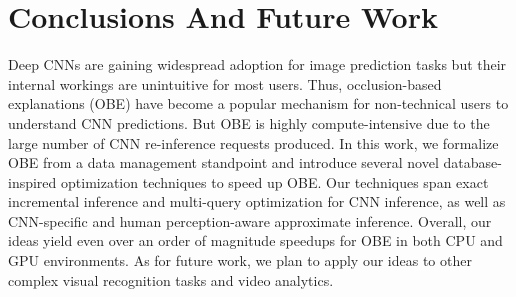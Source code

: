 \documentclass[10pt, sigconf]{acmart}
\newcommand{\red}{\textcolor{red}}
\begin{document}


\section{Conclusions And Future Work}
Deep CNNs are gaining widespread adoption for image prediction tasks but their internal workings are unintuitive for most users. Thus, occlusion-based explanations (OBE) have become a popular mechanism for non-technical users to understand CNN predictions. But OBE is highly compute-intensive due to the large number of CNN re-inference requests produced. In this work, we formalize OBE from a data management standpoint and introduce several novel database-inspired optimization techniques to speed up OBE. Our techniques span exact incremental inference and multi-query optimization for CNN inference, as well as CNN-specific and human perception-aware approximate inference. Overall, our ideas yield even over an order of magnitude speedups for OBE in both CPU and GPU environments.
As for future work, we plan to apply our ideas to other complex visual recognition tasks and video analytics.



\pagebreak





\end{document}
